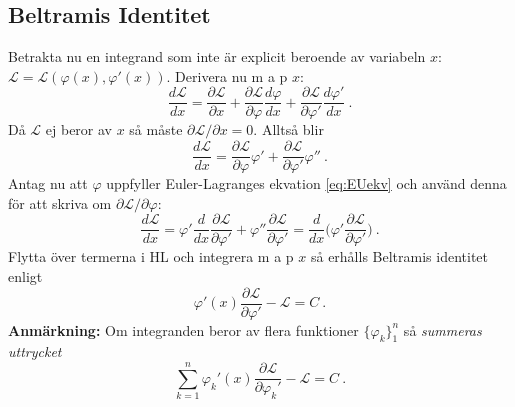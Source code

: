 \documentclass{article}
\begin{document}
\subsection{Beltramis Identitet}
Betrakta nu en integrand som inte är explicit beroende av variabeln $x$: $\mathcal{L}=\mathcal{L}(\varphi(x),\varphi'(x))$. Derivera nu m a p $x$:
$$
\frac{d\mathcal{L}}{d x}=\frac{\partial\mathcal{L}}{\partial x}+\frac{\partial\mathcal{L}}{\partial\varphi}\frac{d\varphi}{dx}+\frac{\partial\mathcal{L}}{\partial\varphi'}\frac{d\varphi'}{dx} \ .
$$
Då $\mathcal{L}$ ej beror av $x$ så måste $\partial\mathcal{L}/\partial x=0$. Alltså blir
$$
\frac{d\mathcal{L}}{d x}=\frac{\partial\mathcal{L}}{\partial\varphi}\varphi'+\frac{\partial\mathcal{L}}{\partial\varphi'}\varphi'' \ .
$$
Antag nu att $\varphi$ uppfyller Euler-Lagranges ekvation \eqref{eq:EUekv} och använd denna för att skriva om $\partial\mathcal{L}/\partial\varphi$:
$$
\frac{d\mathcal{L}}{d x}=\varphi'\frac{d}{dx}\frac{\partial\mathcal{L}}{\partial\varphi'}+\varphi''\frac{\partial\mathcal{L}}{\partial\varphi'} =\frac{d}{dx}\Big(\varphi'\frac{\partial\mathcal{L}}{\partial\varphi'}\Big) \ .
$$
Flytta över termerna i HL och integrera m a p $x$ så erhålls Beltramis identitet enligt
\begin{equation}\label{eq:beltrami}
    \varphi'(x)\frac{\partial\mathcal{L}}{\partial\varphi'}-\mathcal{L}=C \ .
\end{equation}
\textbf{Anmärkning:} Om integranden beror av flera funktioner $\{\varphi_k\}_1^n$ så \textit{summeras uttrycket}
$$
\sum_{k=1}^n\varphi_k'(x)\frac{\partial\mathcal{L}}{\partial\varphi_k'}-\mathcal{L}=C \ .
$$
\newpage
\end{document}

